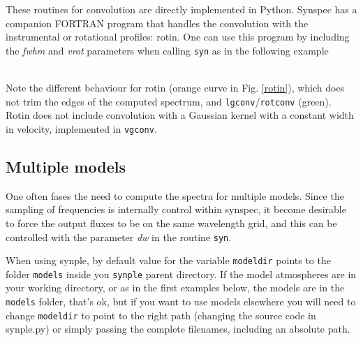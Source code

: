 \documentclass[]{article}
\begin{document}
These routines for convolution are directly implemented in Python. Synspec has a companion FORTRAN program that handles the convolution with the instrumental or rotational profiles: rotin. One can use this program by including the {\it fwhm} and {\it vrot} parameters when calling {\tt syn} as in the following example

\\
\noindent Note the different behaviour for rotin (orange curve in Fig. \ref{rotin}), which does not trim the edges of the computed spectrum, and {\tt lgconv}/{\tt rotconv} (green). Rotin does not include convolution with a Gaussian kernel with a constant width in velocity, implemented in {\tt vgconv}. 

\subsection{Multiple models}

One often fases the need to compute the spectra for multiple models. Since the sampling of frequencies is internally control within synspec, it become desirable to force the output fluxes to be on the same wavelength grid, and this can be controlled with the parameter {\it dw} in the routine {\tt syn}.

When using synple, by default value for the variable {\tt modeldir} points to the folder {\tt models} inside you {\tt synple} parent directory. If the model atmospheres are in your working directory, or as in the first examples below, the models are in the {\tt models} folder, that's ok, but if you want to use models elsewhere you will need to change {\tt modeldir} to point to the right path (changing the source code in synple.py) or simply passing the complete filenames, including an absolute path.
\end{document}
